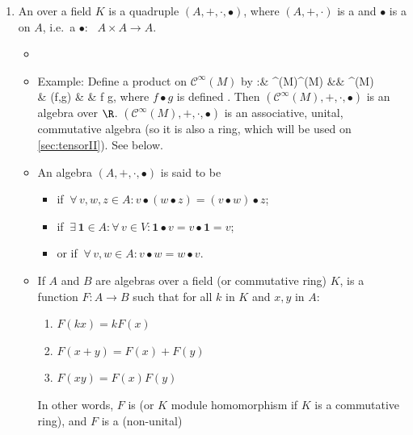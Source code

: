 \documentclass{article}
\newcommand{\cl}{:\text{ }}
\begin{document}
\begin{enumerate}
\item {} 
An  over a field $K$ is a quadruple $(A,+,\cdot,\bullet)$, where $(A,+,\cdot)$ is a  and $\bullet$ is a  on $A$, i.e.\ a  $\bullet \cl A\times A \to A$.
\begin{itemize}
\item {} 
    \item Example: Define a product on $\mathcal{C}^\infty(M)$ by
\bullet \cl & ^\infty(M)\times {}^\infty(M) &\to& ^\infty(M)\\
& (f,g) & \mapsto & f \bullet g,
\ei
where $f \bullet g$ is defined . Then $(\mathcal{C}^\infty(M),+,\cdot,\bullet)$ is an algebra over $\R$. $(\mathcal{C}^\infty(M),+,\cdot,\bullet)$ is an associative, unital, commutative algebra (so it is also a ring, which will be used on \cref{sec:tensorII}). See below.
\item An algebra $(A,+,\cdot,\bullet)$ is said to be
\begin{itemize}[$\ast$]
    \item {} if $\ \forall \, v,w,z\in A :  v\bullet (w\bullet z) = (v\bullet w)\bullet z$;
\item {} if $\ \exists \, \mathbf{1} \in A : \forall \, v \in V : \mathbf{1}\bullet v = v \bullet \mathbf{1} = v$;
\item {} or  if $\ \forall \, v,w\in A :  v\bullet w = w\bullet v$.
\end{itemize}
\item {} If $A$ and $B$ are algebras over a field (or commutative ring) $K$,  is a function $F: A \rightarrow B$ such that for all $k$ in $K$ and $x, y$ in $A$:
\begin{enumerate}
    \item $F(k x)=k F(x)$
    \item $F(x+y)=F(x)+F(y)$
    \item $F(x y)=F(x) F(y)$
\end{enumerate}
In other words, $F$ is  {\tiny (or $K$ module homomorphism if $K$ is a commutative ring),} and  $F$ is a (non-unital) 


\end{itemize}
\end{enumerate}
\end{document}
